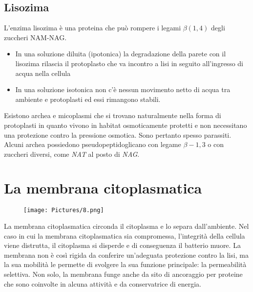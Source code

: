 \subsection{Lisozima}
L’enzima lisozima è una proteina che può rompere i legami $\beta(1, 4)$ degli zuccheri NAM-NAG.
\begin{itemize}
\item In una soluzione diluita (ipotonica) la degradazione della parete con il lisozima rilascia il protoplasto che va incontro a lisi in seguito 
all’ingresso di acqua nella cellula
\item In una soluzione isotonica non c’è nessun movimento netto di acqua tra ambiente e protoplasti ed essi rimangono stabili.
\end{itemize}
Esistono archea e micoplasmi che si trovano naturalmente nella forma di protoplasti in quanto vivono in habitat osmoticamente protetti e non necessitano una protezione contro la 
pressione osmotica. Sono pertanto spesso parassiti. Alcuni archea possiedono pseudopeptidoglicano con legame $\beta-1,3$ o con zuccheri diversi, come \emph{NAT} al posto di \emph{NAG}.
\section{La membrana citoplasmatica}
\begin{figure}[H]
	\texttt{[image: Pictures/8.png]}
\end{figure}
La membrana citoplasmatica circonda il citoplasma e lo separa dall’ambiente. Nel caso in cui la membrana citoplasmatica sia compromessa, l’integrità della 
cellula viene distrutta, il citoplasma si disperde e di conseguenza il batterio muore. La membrana non è così rigida da conferire un’adeguata protezione 
contro la lisi, ma la sua mobilità le permette di svolgere la sua funzione principale: la permeabilità selettiva. Non solo, la membrana funge 
anche da sito di ancoraggio per proteine che sono coinvolte in alcuna attività e da conservatrice di energia.
